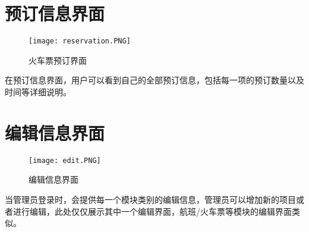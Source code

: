 \section{预订信息界面}
\begin{figure}[H]
	\centering
	\texttt{[image: reservation.PNG]}
	\caption{火车票预订界面} 
	\label{fig:figure11}
\end{figure}
在预订信息界面，用户可以看到自己的全部预订信息，包括每一项的预订数量以及时间等详细说明。

\section{编辑信息界面}
\begin{figure}[H]
	\centering
	\texttt{[image: edit.PNG]}
	\caption{编辑信息界面} 
	\label{fig:figure12}
\end{figure}
当管理员登录时，会提供每一个模块类别的编辑信息，管理员可以增加新的项目或者进行编辑，此处仅仅展示其中一个编辑界面，航班/火车票等模块的编辑界面类似。
